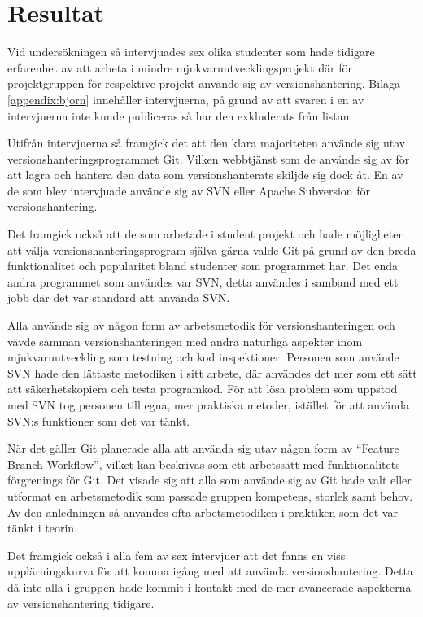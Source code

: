\section{Resultat}
Vid undersökningen så intervjuades sex olika studenter som hade tidigare erfarenhet av att arbeta i mindre mjukvaruutvecklingsprojekt där för projektgruppen för respektive projekt använde sig av versionshantering. Bilaga \ref{appendix:bjorn} innehåller intervjuerna, på grund av att svaren i en av intervjuerna inte kunde publiceras så har den exkluderats från listan.

Utifrån intervjuerna så framgick det att den klara majoriteten använde sig utav versionshanteringsprogrammet Git. Vilken webbtjänst som de använde sig av för att lagra och hantera den data som versionshanterats skiljde sig dock åt. En av de som blev intervjuade använde sig av SVN eller Apache Subversion för versionshantering.\cite{VersionControlSvn}

Det framgick också att de som arbetade i student projekt och hade möjligheten att välja versionshanteringsprogram själva gärna valde Git på grund av den breda funktionalitet och popularitet bland studenter som programmet har. Det enda andra programmet som användes var SVN, detta användes i samband med ett jobb där det var standard att använda SVN.

Alla använde sig av någon form av arbetsmetodik för versionshanteringen och vävde samman versionshanteringen med andra naturliga aspekter inom mjukvaruutveckling som testning och kod inspektioner. Personen som använde SVN hade den lättaste metodiken i sitt arbete, där användes det mer som ett sätt att säkerhetskopiera och testa programkod. För att lösa problem som uppstod med SVN tog personen till egna, mer praktiska metoder, istället för att använda SVN:s funktioner som det var tänkt.

 När det gäller Git planerade alla att använda sig utav någon form av ``Feature Branch Workflow'', vilket kan beskrivas som ett arbetssätt med funktionalitets förgrenings för Git. Det visade sig att alla som använde sig av Git hade valt eller utformat en arbetsmetodik som passade gruppen kompetens, storlek samt behov. Av den anledningen så användes ofta arbetsmetodiken i praktiken som det var tänkt i teorin.

Det framgick också i alla fem av sex intervjuer att det fanns en viss upplärningskurva för att komma igång med att använda versionshantering. Detta då inte alla i gruppen hade kommit i kontakt med de mer avancerade aspekterna av versionshantering tidigare.

